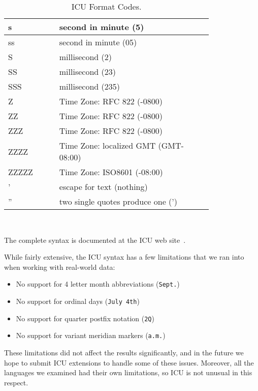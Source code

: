 \begin{table}[ht]
\begin{tabular}{|p{0.2\linewidth}| p{0.6\linewidth}|}
\scriptsize{s} & \scriptsize{second in minute (5)}\\ \hline
\scriptsize{ss} & \scriptsize{second in minute (05)}\\ \hline
    
\scriptsize{S} & \scriptsize{millisecond (2)}\\ \hline
\scriptsize{SS} & \scriptsize{millisecond (23)}\\ \hline
\scriptsize{SSS} & \scriptsize{millisecond (235)}\\ \hline
    
\scriptsize{Z} & \scriptsize{Time Zone: RFC 822 (-0800)}\\ \hline
\scriptsize{ZZ} & \scriptsize{Time Zone: RFC 822 (-0800)}\\ \hline
\scriptsize{ZZZ} & \scriptsize{Time Zone: RFC 822 (-0800)}\\ \hline
\scriptsize{ZZZZ} & \scriptsize{Time Zone: localized GMT (GMT-08:00)}\\ \hline
\scriptsize{ZZZZZ} & \scriptsize{Time Zone: ISO8601 (-08:00)}\\ \hline
    
\scriptsize{'} & \scriptsize{escape for text (nothing)}\\ \hline
\scriptsize{''} & \scriptsize{two single quotes produce one (')}\\ \hline

\end{tabular}
\label{tab:icuformats} \\
\caption{ICU Format Codes.}
\end{table}

The complete syntax is documented at the ICU web site~\cite{ICU}. 

While fairly extensive, the ICU syntax has a few limitations that we ran into when working with real-world data:
\begin{itemize}
\item No support for 4 letter month abbreviations (\eg \texttt{Sept.})
\item No support for ordinal days (\eg \texttt{July 4th})
\item No support for quarter postfix notation (\eg \texttt{2Q})
\item No support for variant meridian markers (\eg \texttt{a.m.})
\end{itemize}

These limitations did not affect the results significantly, and in the future we hope to submit ICU extensions to handle some of these issues. Moreover, all the languages we examined had their own limitations, so ICU is not unusual in this respect.

